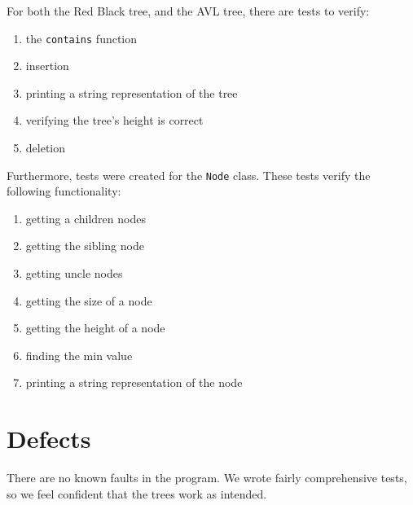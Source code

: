 \documentclass[letterpaper]{article}
\begin{document}
For both the Red Black tree, and the AVL tree, there are tests to verify:
\begin{enumerate}
  \item the \texttt{contains} function
  \item insertion
  \item printing a string representation of the tree
  \item verifying the tree's height is correct
  \item deletion
\end{enumerate}

Furthermore, tests were created for the \texttt{Node} class. These tests verify
the following functionality:
\begin{enumerate}
  \item getting a children nodes
  \item getting the sibling node
  \item getting uncle nodes
  \item getting the size of a node
  \item getting the height of a node
  \item finding the min value
  \item printing a string representation of the node
\end{enumerate}

\section{Defects}

There are no known faults in the program.
We wrote fairly comprehensive tests, so we feel confident that the trees work as
intended.
\end{document}
